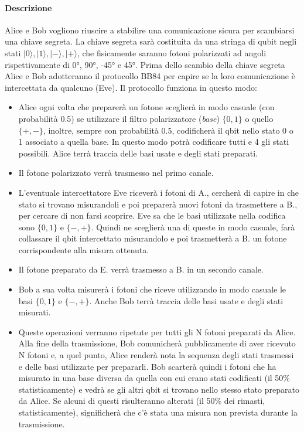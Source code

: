 \documentclass[11 pt, a4paper]{article}
\begin{document}
\paragraph{Descrizione}
Alice e Bob vogliono riuscire a stabilire una comunicazione sicura per scambiarsi una chiave segreta. La chiave segreta sarà costituita da una stringa di qubit negli stati $|0\rangle, |1\rangle, |-\rangle, |+\rangle$, che fisicamente saranno fotoni polarizzati ad angoli rispettivamente di 0°, 90°, -45° e 45°.
Prima dello scambio della chiave segreta Alice e Bob adotteranno il protocollo BB84 per capire se la loro comunicazione è intercettata da qualcuno (Eve). Il protocollo funziona in questo modo:
\begin{itemize}
    \item Alice ogni volta che preparerà un fotone sceglierà in modo casuale (con probabilità 0.5) se utilizzare il filtro polarizzatore (\textit{base}) $\{0,1\}$ o quello $\{+,-\}$, inoltre, sempre con probabilità 0.5, codificherà il qbit nello stato 0 o 1 associato a quella base. In questo modo potrà codificare tutti e 4 gli stati possibili. Alice terrà traccia delle basi usate e degli stati preparati.
    \item Il fotone polarizzato verrà trasmesso nel primo canale.
    \item L'eventuale intercettatore Eve riceverà i fotoni di A., cercherà di capire in che stato si trovano misurandoli e poi preparerà nuovi fotoni da trasmettere a B., per cercare di non farsi scoprire. Eve sa che le basi utilizzate nella codifica sono $\{0,1\}$ e $\{-,+\}$. Quindi ne sceglierà una di queste in modo casuale, farà collassare il qbit intercettato misurandolo e poi trasmetterà a B. un fotone corrispondente alla misura ottenuta.
    \item Il fotone preparato da E. verrà trasmesso a B. in un secondo canale.
    \item Bob a sua volta misurerà i fotoni che riceve utilizzando in modo casuale le basi $\{0,1\}$ e $\{-,+\}$. Anche Bob terrà traccia delle basi usate e degli stati misurati.
    \item Queste operazioni verranno ripetute per tutti gli N fotoni preparati da Alice. Alla fine della trasmissione, Bob comunicherà pubblicamente di aver ricevuto N fotoni e, a quel punto, Alice renderà nota la sequenza degli stati trasmessi e delle basi utilizzate per prepararli. Bob scarterà quindi i fotoni che ha misurato in una base diversa da quella con cui erano stati codificati (il 50\% statisticamente) e vedrà se gli altri qbit si trovano nello stesso stato preparato da Alice. Se alcuni di questi risulteranno alterati (il 50\% dei rimasti, statisticamente), significherà che c'è stata una misura non prevista durante la trasmissione.
\end{itemize}
\end{document}
